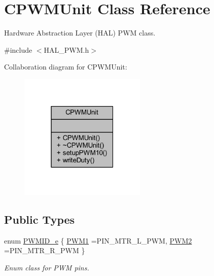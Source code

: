 \hypertarget{class_c_p_w_m_unit}{}\section{C\+P\+W\+M\+Unit Class Reference}
\label{class_c_p_w_m_unit}


Hardware Abstraction Layer (H\+AL) P\+WM class.  




{\ttfamily \#include $<$H\+A\+L\+\_\+\+P\+W\+M.\+h$>$}



Collaboration diagram for C\+P\+W\+M\+Unit\+:
\nopagebreak
\begin{figure}[H]
\begin{center}
\leavevmode
\includegraphics[width=171pt]{class_c_p_w_m_unit__coll__graph}
\end{center}
\end{figure}
\subsection*{Public Types}
\begin{DoxyCompactItemize}
\item 
enum \mbox{\hyperlink{class_c_p_w_m_unit_ad3e55d1df0367d8a090d4b835704be44}{P\+W\+M\+I\+D\+\_\+e}} \{ \mbox{\hyperlink{class_c_p_w_m_unit_ad3e55d1df0367d8a090d4b835704be44a3f6167a7882e80f1ad05c8bff5e538c0}{P\+W\+M1}} =P\+I\+N\+\_\+\+M\+T\+R\+\_\+\+L\+\_\+\+P\+WM, 
\mbox{\hyperlink{class_c_p_w_m_unit_ad3e55d1df0367d8a090d4b835704be44afc7888ea63be5da5551d10db3d676185}{P\+W\+M2}} =P\+I\+N\+\_\+\+M\+T\+R\+\_\+\+R\+\_\+\+P\+WM
 \}
\begin{DoxyCompactList}\small\item\em Enum class for P\+WM pins. \end{DoxyCompactList}\end{DoxyCompactItemize}
